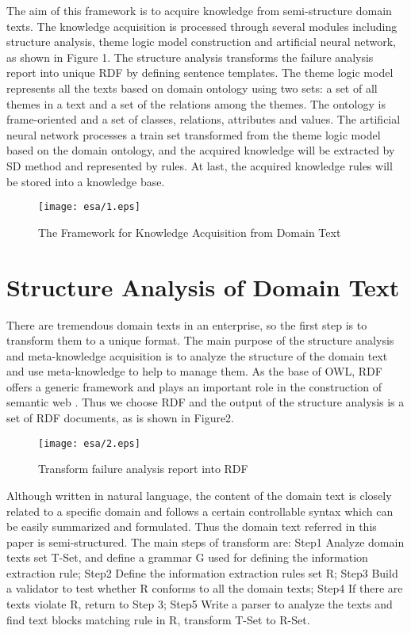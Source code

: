 \documentclass{elsarticle}
\begin{document}
The aim of this framework is to acquire knowledge from semi-structure
domain texts. The knowledge acquisition is processed through several
modules including structure analysis, theme logic model construction
and artificial neural network, as shown in Figure 1. The structure
analysis transforms the failure analysis report into unique RDF by
defining sentence templates. The theme logic model represents all the
texts based on domain ontology using two sets: a set of all themes in
a text and a set of the relations among the themes. The ontology is
frame-oriented and a set of classes, relations, attributes and
values. The artificial neural network processes a train set
transformed from the theme logic model based on the domain ontology,
and the acquired knowledge will be extracted by SD method and
represented by rules. At last, the acquired knowledge rules will be
stored into a knowledge base.
\begin{figure}[htp]
  \centering
  \texttt{[image: esa/1.eps]}

  \caption{The Framework for Knowledge Acquisition from Domain Text}
  \label{fig:1}
\end{figure}

\section{Structure Analysis of Domain Text 
}
\label{sec:struct-analys-doma}

There are tremendous domain texts in an enterprise, so the first step
is to transform them to a unique format. The main purpose of the
structure analysis and meta-knowledge acquisition is to analyze the
structure of the domain text and use meta-knowledge to help to manage
them. As the base of OWL, RDF offers a generic framework and plays an
important role in the construction of semantic web \cite{lassila1999rdf}. Thus we
choose RDF and the output of the structure analysis is a set of RDF
documents, as is shown in Figure2. 
\begin{figure}[htp]
  \centering
  \texttt{[image: esa/2.eps]}

  \caption{Transform failure analysis report into RDF}
  \label{fig:2}
\end{figure}
Although written in natural language, the content of the domain text is closely related to a specific domain and follows a certain controllable syntax which can be easily summarized and formulated. Thus the domain text referred in this paper is semi-structured. The main steps of transform are:
Step1 Analyze domain texts set T-Set, and define a grammar G used for defining the information extraction rule;
Step2 Define the information extraction rules set R;
Step3 Build a validator to test whether R conforms to all the domain texts;
Step4 If there are texts violate R, return to Step 3;
Step5 Write a parser to analyze the texts and find text blocks
matching rule in R, transform T-Set to R-Set.  
\end{document}
